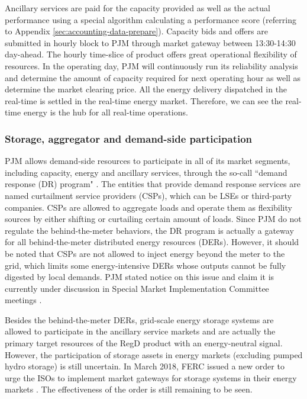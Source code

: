 Ancillary services are paid for the capacity provided as well as the actual performance using a special algorithm calculating a performance score (referring to Appendix \ref{sec:accounting-data-prepare}). Capacity bids and offers are submitted in hourly block to PJM through market gateway between 13:30-14:30 day-ahead. The hourly time-slice of product offers great operational flexibility of resources. In the operating day, PJM will continuously run its reliability analysis and determine the amount of capacity required for next operating hour as well as determine the market clearing price. All the energy delivery dispatched in the real-time is settled in the real-time energy market. Therefore, we can see the real-time energy is the hub for all real-time operations.

\subsubsection{Storage, aggregator and demand-side participation}
PJM allows demand-side resources to participate in all of its market segments, including capacity, energy and ancillary services, through the so-call ``demand response (DR) program"  \cite{PJMInterconnection2017}. The entities that provide demand response services are named curtailment service providers (CSPs), which can be LSEs or third-party companies. CSPs are allowed to aggregate loads and operate them as flexibility sources by either shifting or curtailing certain amount of loads. Since PJM do not regulate the behind-the-meter behaviors, the DR program is actually a gateway for all behind-the-meter distributed energy resources (DERs). However, it should be noted that CSPs are not allowed to inject energy beyond the meter to the grid, which limits some energy-intensive DERs whose outputs cannot be fully digested by local demands. PJM stated notice on this issue and claim it is currently under discussion in Special Market Implementation Committee meetings \cite{PJMInterconnection2017}.

Besides the behind-the-meter DERs, grid-scale energy storage systems are allowed to participate in the ancillary service markets and are actually the primary target resources of the RegD product with an energy-neutral signal. However, the participation of storage assets in energy markets (excluding pumped hydro storage) is still uncertain. In March 2018, FERC issued a new order to urge the ISOs to implement market gateways for storage systems in their energy markets \cite{FERC841}. The effectiveness of the order is still remaining to be seen.

